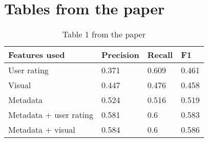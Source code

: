 \documentclass[sigconf]{acmart}
\begin{document}
\newpage
\clearpage
\newpage
\appendix

\section{Tables from the paper}

\begin{table}[hbt!]
  \caption*{Table 1 from the paper}
  \begin{tabular}{llll}
    \hline
    Features used          & Precision & Recall & F1    \\ \hline
    User rating            & 0.371     & 0.609  & 0.461 \\
    Visual                 & 0.447     & 0.476  & 0.458 \\
    Metadata               & 0.524     & 0.516  & 0.519 \\
    Metadata + user rating & 0.581     & 0.6    & 0.583 \\
    Metadata + visual      & 0.584     & 0.6    & 0.586 \\ \hline
  \end{tabular}
\end{table}
\end{document}
